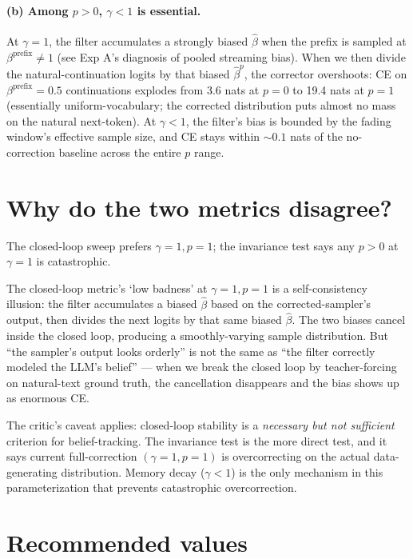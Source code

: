 \documentclass[11pt]{article}
\begin{document}
\paragraph{(b) Among $p > 0$, $\gamma < 1$ is essential.}
At $\gamma = 1$, the filter accumulates a strongly biased $\hat\beta$
when the prefix is sampled at $\beta^{\mathrm{prefix}} \neq 1$ (see Exp A's
diagnosis of pooled streaming bias). When we then divide the
natural-continuation logits by that biased $\hat\beta^p$, the corrector
overshoots: CE on $\beta^{\mathrm{prefix}}=0.5$ continuations explodes
from 3.6 nats at $p=0$ to 19.4 nats at $p=1$ (essentially
uniform-vocabulary; the corrected distribution puts almost no mass on
the natural next-token).  At $\gamma < 1$, the filter's bias is bounded
by the fading window's effective sample size, and CE stays within $\sim
0.1$ nats of the no-correction baseline across the entire $p$ range.

\section{Why do the two metrics disagree?}

The closed-loop sweep prefers $\gamma = 1, p = 1$; the invariance test
says any $p > 0$ at $\gamma = 1$ is catastrophic.

The closed-loop metric's `low badness' at $\gamma = 1, p = 1$ is a
self-consistency illusion: the filter accumulates a biased $\hat\beta$
based on the corrected-sampler's output, then divides the next logits by
that same biased $\hat\beta$. The two biases cancel inside the closed
loop, producing a smoothly-varying sample distribution. But ``the
sampler's output looks orderly'' is not the same as ``the filter
correctly modeled the LLM's belief'' --- when we break the closed loop
by teacher-forcing on natural-text ground truth, the cancellation
disappears and the bias shows up as enormous CE.

The critic's caveat applies: closed-loop stability is a \emph{necessary
but not sufficient} criterion for belief-tracking. The invariance test
is the more direct test, and it says current full-correction
$(\gamma = 1, p = 1)$ is overcorrecting on the actual data-generating
distribution. Memory decay ($\gamma < 1$) is the only mechanism in this
parameterization that prevents catastrophic overcorrection.

\section{Recommended values}
\end{document}
